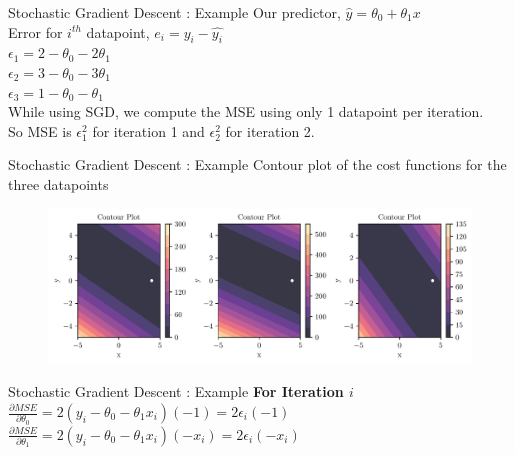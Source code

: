 \documentclass[usenames,dvipsnames]{beamer}
\begin{document}
                        \begin{frame}{Stochastic Gradient Descent : Example}
                        Our predictor, $\hat{y} = \theta_0 + \theta_1x$\\
                        \vspace{1cm}
                        Error for $i^{th}$ datapoint, $e_i = y_i - \hat{y_i}$\\
                        
                        $\epsilon_1 = 2 - \theta_0 - 2\theta_1$ \\
                        $\epsilon_2 = 3 - \theta_0 - 3\theta_1$ \\
                        $\epsilon_3 = 1 - \theta_0 - \theta_1$ \\
                        
                        \vspace{1cm}
                        While using SGD, we compute the MSE using only 1 datapoint per iteration. \\
                        So MSE is $\epsilon_1^2$ for iteration 1 and $\epsilon_2^2$ for iteration 2.
                        \end{frame}

                        \begin{frame}{Stochastic Gradient Descent : Example}
                            Contour plot of the cost functions for the three datapoints
                            \begin{figure}
                                \includegraphics[scale=0.5]{../../maths/assets/mathematical-ml/figures/gradient-descent-3-functions.pdf}
                            \end{figure}
                        \end{frame}
                        
                        
                        \begin{frame}{Stochastic Gradient Descent : Example}
                        \textbf{For Iteration $i$}\\
                        \vspace{1cm}
                        $\frac{\partial MSE}{\partial \theta_0} = 2\left( y_i - \theta_0 -\theta_1x_i \right)\left(-1\right) = 2\epsilon_i\left(-1\right)$ \\
                        \vspace{2cm}
                        $\frac{\partial MSE}{\partial \theta_1} = 2\left( y_i - \theta_0 -\theta_1x_i \right)\left(-x_i\right) = 2\epsilon_i\left(-x_i\right)$ 
                        \end{frame}
                        
\end{document}
